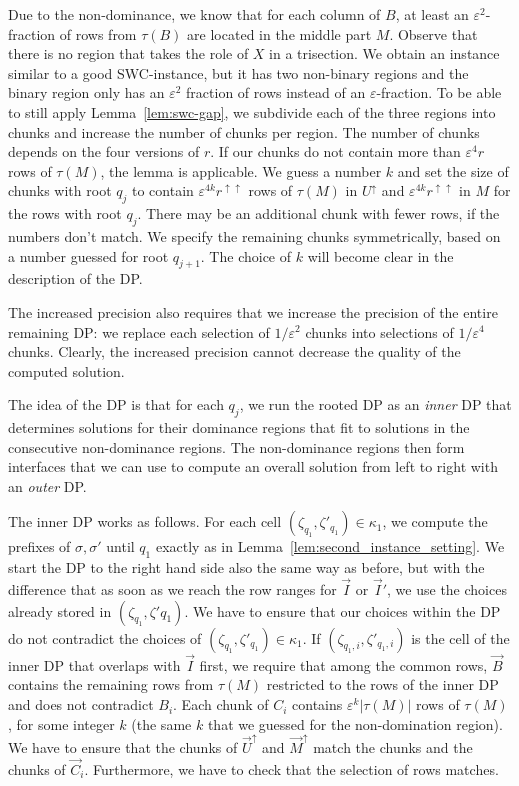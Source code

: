 Due to the non-dominance, we know that for each column of ${B}$, at least an $\varepsilon^2$-fraction of rows from $\tau(B)$ are located in the middle part ${M}$.
Observe that there is no region that takes the role of $X$ in a trisection.
We obtain an instance similar to a good SWC-instance, but it has two non-binary regions and the binary region only has an $\varepsilon^2$ fraction of rows instead of an $\varepsilon$-fraction.
To be able to still apply Lemma~\ref{lem:swc-gap}, we subdivide each of the three regions into chunks and increase the number of chunks per region. 
The number of chunks depends on  the four versions of ${r}$. 
If our chunks do not contain more than $\varepsilon^4 {r}$ rows of $\tau(M)$, the lemma is applicable.
We guess a number $k$ and set the size of chunks with root $q_j$ to contain $\varepsilon^{4k} {r}^{\uparrow\uparrow}$ rows of $\tau(M)$ in ${U}^\uparrow$ and $\varepsilon^{4k} {r}^{\uparrow\uparrow}$ in ${M}$ for the rows with root $q_j$.
There may be an additional chunk with fewer rows, if the numbers don't match.
We specify the remaining chunks symmetrically, based on a number guessed for root $q_{j+1}$.
The choice of $k$ will become clear in the description of the DP.

The increased precision also requires that we  increase the precision of the entire remaining DP: we replace each selection of $1/\varepsilon^2$ chunks into selections of $1/\varepsilon^4$ chunks.
Clearly, the increased precision cannot decrease the quality of the computed solution.

The idea of the DP is that for each $q_j$, we run the rooted DP as an \emph{inner} DP that determines solutions for their dominance regions that fit to solutions in the consecutive non-dominance regions.
The non-dominance regions then form interfaces that we can use to compute an overall solution from left to right with an \emph{outer} DP.

The inner DP works as follows.
For each cell $(\zeta_{q_1},\zeta'_{q_1}) \in \kappa_1$, we compute the prefixes of $\sigma,\sigma'$ until $q_1$ exactly as in Lemma~\ref{lem:second_instance_setting}.
We start the DP to the right hand side also the same way as before, but with the difference that as soon as we reach the row ranges for $\overrightarrow{I}$ or $\overrightarrow{I}'$, we use the choices already stored in $(\zeta_{q_1},\zeta'{q_1})$.
We have to ensure that our choices within the DP do not contradict the choices of  $(\zeta_{q_1},\zeta'_{q_1}) \in \kappa_1$. 
If $(\zeta_{q_1,i},\zeta'_{q_1,i})$ is the cell of the inner DP that overlaps with $\overrightarrow{I}$ first, we require that among the common rows, $\overrightarrow{B}$ contains the remaining rows from $\tau(M)$ restricted to the rows of the inner DP and does not contradict $B_i$. 
Each chunk of $C_i$ contains $\varepsilon^k |\tau(M)|$ rows of $\tau(M)$, for some integer $k$ (the same $k$ that we guessed for the non-domination region). 
We have to ensure that the chunks of $\overrightarrow{U}^\uparrow$ and $\overrightarrow{M}^\uparrow$ match the chunks and the chunks of $\overrightarrow{C}_i$.
Furthermore, we have to check that the selection of rows matches.

